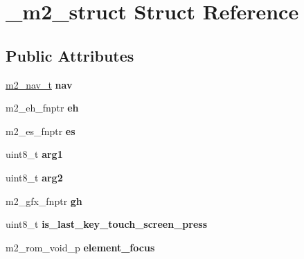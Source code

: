 \hypertarget{struct__m2__struct}{\section{\-\_\-m2\-\_\-struct Struct Reference}
\label{struct__m2__struct}
}
\subsection*{Public Attributes}
\begin{DoxyCompactItemize}
\item 
\hypertarget{struct__m2__struct_ac98b6c9eb02c1747801528a46ef3d298}{\hyperlink{struct__m2__nav__struct}{m2\-\_\-nav\-\_\-t} {\bfseries nav}}\label{struct__m2__struct_ac98b6c9eb02c1747801528a46ef3d298}

\item 
\hypertarget{struct__m2__struct_a2410f62156e812dec57b25b50eb71fbe}{m2\-\_\-eh\-\_\-fnptr {\bfseries eh}}\label{struct__m2__struct_a2410f62156e812dec57b25b50eb71fbe}

\item 
\hypertarget{struct__m2__struct_abc53ee56ef6ffb5c4020511fdcb188e0}{m2\-\_\-es\-\_\-fnptr {\bfseries es}}\label{struct__m2__struct_abc53ee56ef6ffb5c4020511fdcb188e0}

\item 
\hypertarget{struct__m2__struct_a29e4ff97b0d58b8438e70bb6f9dbaf6a}{uint8\-\_\-t {\bfseries arg1}}\label{struct__m2__struct_a29e4ff97b0d58b8438e70bb6f9dbaf6a}

\item 
\hypertarget{struct__m2__struct_aeb7ff5cd2da89551fe289463a1d0b36d}{uint8\-\_\-t {\bfseries arg2}}\label{struct__m2__struct_aeb7ff5cd2da89551fe289463a1d0b36d}

\item 
\hypertarget{struct__m2__struct_a82eba733ebf893c7cde867b6e75fdb5d}{m2\-\_\-gfx\-\_\-fnptr {\bfseries gh}}\label{struct__m2__struct_a82eba733ebf893c7cde867b6e75fdb5d}

\item 
\hypertarget{struct__m2__struct_a2b3eb87c96a3ef6c63ce352c8b55aa1b}{uint8\-\_\-t {\bfseries is\-\_\-last\-\_\-key\-\_\-touch\-\_\-screen\-\_\-press}}\label{struct__m2__struct_a2b3eb87c96a3ef6c63ce352c8b55aa1b}

\item 
\hypertarget{struct__m2__struct_a6032e834067a281cb662f8f935191a2f}{m2\-\_\-rom\-\_\-void\-\_\-p {\bfseries element\-\_\-focus}}\label{struct__m2__struct_a6032e834067a281cb662f8f935191a2f}


\end{DoxyCompactItemize}
